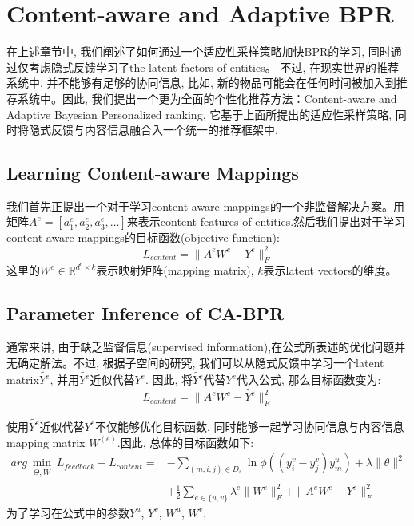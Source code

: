 \section{Content-aware and Adaptive BPR}
在上述章节中, 我们阐述了如何通过一个适应性采样策略加快BPR的学习, 同时通过仅考虑隐式反馈学习了the latent factors of entities。 不过, 在现实世界的推荐系统中, 并不能够有足够的协同信息, 比如, 新的物品可能会在任何时间被加入到推荐系统中。因此, 我们提出一个更为全面的个性化推荐方法：Content-aware and Adaptive Bayesian Personalized ranking, 它基于上面所提出的适应性采样策略, 同时将隐式反馈与内容信息融合入一个统一的推荐框架中.


\subsection{Learning Content-aware Mappings}
我们首先正提出一个对于学习content-aware mappings的一个非监督解决方案。用矩阵$A^e = \left[a_1^e,a_2^e,a_3^e,\dots\right]$来表示content features of entities.然后我们提出对于学习content-aware mappings的目标函数(objective function):
\begin{equation}
L_{content} = \| A^eW^e - Y^e\|_F^2
\end{equation}
这里的$W^e \in \mathbb{R}^{d^e \times k}$表示映射矩阵(mapping matrix), $k$表示latent vectors的维度。




\subsection{Parameter Inference of CA-BPR}
通常来讲, 由于缺乏监督信息(supervised information),在公式所表述的优化问题并无确定解法。不过, 根据子空间的研究, 我们可以从隐式反馈中学习一个latent matrix$\widetilde{Y^e}$, 并用$\widetilde{Y^e}$近似代替$Y^e$. 因此, 将$\widetilde{Y^e}$代替$Y^e$代入公式, 那么目标函数变为: 
\begin{equation}
L_{content} = \| A^eW^e - \widetilde{Y^e}\|_F^2
\end{equation}

使用$\widetilde{Y^e}$近似代替$Y^e$不仅能够优化目标函数, 同时能够一起学习协同信息与内容信息mapping matrix $W^{\left(e\right)}$.因此, 总体的目标函数如下:
\begin{equation}
\begin{split}
arg \min_{\substack{\Theta, W}} L_{feedback}+L_{content}  = 
& - \sum_{\left(m,i,j\right) \in D_s} \ln \phi\left(\left(y_i^v - y_j^v\right)y_m^u\right) + \lambda\|\theta\|^2\\
& + \frac 12 \sum_{e\in \{u,v\}}\lambda^e\|W^e\|^2_F + \|A^eW^e-Y^e\|^2_F
\end{split}
\end{equation}
为了学习在公式中的参数$Y^u$, $Y^v$, $W^u$, $W^v$, 

